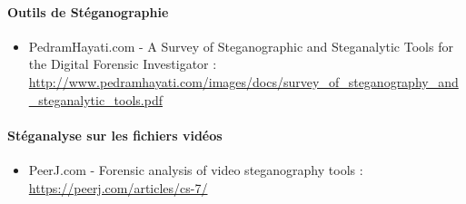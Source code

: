 \documentclass[11pt]{article}
\begin{document}
\paragraph{Outils de Stéganographie}
\begin{itemize}
\item PedramHayati.com - A Survey of Steganographic and Steganalytic Tools for the Digital Forensic Investigator : \\
    \url{http://www.pedramhayati.com/images/docs/survey_of_steganography_and_steganalytic_tools.pdf}
\end{itemize}

\paragraph{Stéganalyse sur les fichiers vidéos}
\begin{itemize}
\item PeerJ.com - Forensic analysis of video steganography tools : \\
    \url{https://peerj.com/articles/cs-7/}
\end{itemize}
\end{document}
